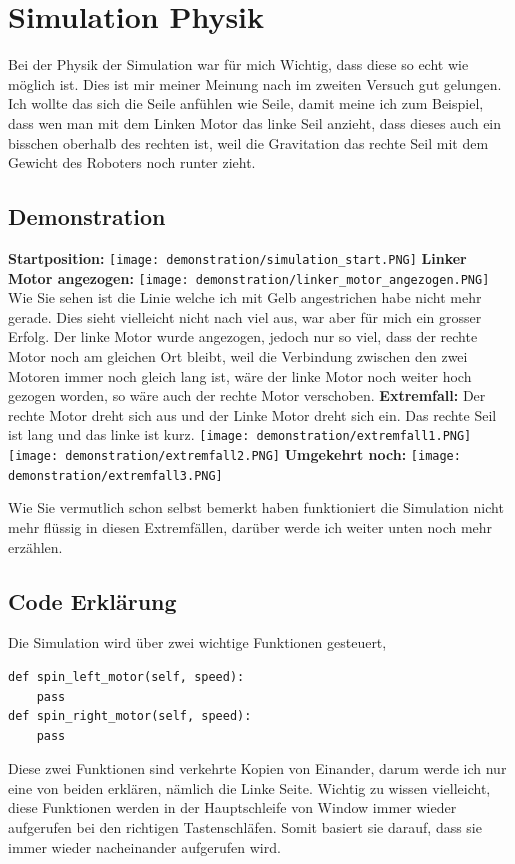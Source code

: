 \documentclass[12pt]{article}
\begin{document}
\section{Simulation Physik}

Bei der Physik der Simulation war für mich Wichtig, dass diese so echt wie möglich ist. Dies ist mir meiner Meinung nach im zweiten Versuch gut gelungen. Ich wollte das sich die Seile anfühlen wie Seile, damit meine ich zum Beispiel, dass wen man mit dem Linken Motor das linke Seil anzieht, dass dieses auch ein bisschen oberhalb des rechten ist, weil die Gravitation das rechte Seil mit dem Gewicht des Roboters noch runter zieht.
\subsection{Demonstration}
\textbf{Startposition:}\newline
\texttt{[image: demonstration/simulation\_start.PNG]}
\textbf{Linker Motor angezogen:} \newline
\texttt{[image: demonstration/linker\_motor\_angezogen.PNG]}
Wie Sie sehen ist die Linie welche ich mit Gelb angestrichen habe nicht mehr gerade. Dies sieht vielleicht nicht nach viel aus, war aber für mich ein grosser Erfolg. Der linke Motor wurde angezogen, jedoch nur so viel, dass der rechte Motor noch am gleichen Ort bleibt, weil die Verbindung zwischen den zwei Motoren immer noch gleich lang ist, wäre der linke Motor noch weiter hoch gezogen worden, so wäre auch der rechte Motor verschoben.\newline \newline
\textbf{Extremfall:} \newline
Der rechte Motor dreht sich aus und der Linke Motor dreht sich ein. Das rechte Seil ist lang und das linke ist kurz.\newline
\texttt{[image: demonstration/extremfall1.PNG]}
\texttt{[image: demonstration/extremfall2.PNG]}
\textbf{Umgekehrt noch:}\newline
\texttt{[image: demonstration/extremfall3.PNG]}

Wie Sie vermutlich schon selbst bemerkt haben funktioniert die Simulation nicht mehr flüssig in diesen Extremfällen, darüber werde ich weiter unten noch mehr erzählen.

\subsection{Code Erklärung}
Die Simulation wird über zwei wichtige Funktionen gesteuert,
\begin{lstlisting}
def spin_left_motor(self, speed):
	pass
def spin_right_motor(self, speed):
	pass
\end{lstlisting}
Diese zwei Funktionen sind verkehrte Kopien von Einander, darum werde ich nur eine von beiden erklären, nämlich die Linke Seite.
Wichtig zu wissen vielleicht, diese Funktionen werden in der Hauptschleife von Window immer wieder aufgerufen bei den richtigen Tastenschläfen. Somit basiert sie darauf, dass sie immer wieder nacheinander aufgerufen wird. \pagebreak
\end{document}
